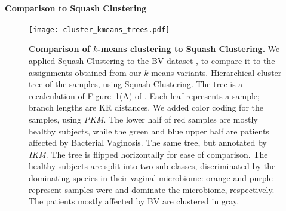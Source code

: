 
\paragraph{Comparison to Squash Clustering}
\label{ch:Clustering:sec:Results:sub:BVDataset:par:SquashClustering}

\begin{figure}[!htpb]
    \centering
    \texttt{[image: cluster\_kmeans\_trees.pdf]}
    \begin{subfigure}{0pt}
        \label{fig:cluster_kmeans_trees:sub:mass_tree}
    \end{subfigure}
    \begin{subfigure}{0pt}
        \label{fig:cluster_kmeans_trees:sub:imbalance_tree}
    \end{subfigure}
    \caption[Comparison of $k$-means clustering to Squash Clustering]{
        \textbf{Comparison of $k$-means clustering to Squash Clustering.}
        We applied Squash Clustering to the \ac{BV} dataset \cite{Srinivasan2012},
        to compare it to the assignments obtained from our $k$-means variants.
        Hierarchical cluster tree of the samples, using Squash Clustering.
        The tree is a recalculation of Figure~1(A) of \cite{Srinivasan2012}.
        Each leaf represents a sample; branch lengths are KR distances.
        We added color coding for the samples, using \emph{PKM}.
        The lower half of red samples are mostly healthy subjects,
        while the green and blue upper half are patients affected by Bacterial Vaginosis.
        The same tree, but annotated by \emph{IKM}.
        The tree is flipped horizontally for ease of comparison.
        The healthy subjects are split into two sub-classes,
        discriminated by the dominating species in their vaginal microbiome:
        orange and purple represent samples were  and 
        dominate the microbiome, respectively.
        The patients mostly affected by BV are clustered in gray.
    }
    \label{fig:cluster_kmeans_trees}
\end{figure}

